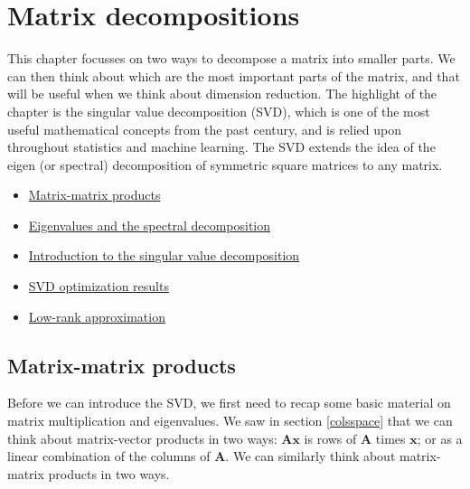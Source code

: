 \documentclass[]{book}
\providecommand{\tightlist}{%
  \setlength{\itemsep}{0pt}\setlength{\parskip}{0pt}}
\theoremstyle{definition}
\theoremstyle{definition}
\theoremstyle{definition}
\theoremstyle{remark}
\begin{document}
\hypertarget{linalg-decomp}{%
\chapter{Matrix decompositions}\label{linalg-decomp}}

This chapter focusses on two ways to decompose a matrix into smaller parts. We can then think about which are the most important parts of the matrix, and that will be useful when we think about dimension reduction. The highlight of the chapter is the singular value decomposition (SVD), which is one of the most useful mathematical concepts from the past century, and is relied upon throughout statistics and machine learning. The SVD extends the idea of the eigen (or spectral) decomposition of symmetric square matrices to any matrix.

\begin{itemize}
\tightlist
\item
  \href{https://mediaspace.nottingham.ac.uk/media/Matrix-matrix+products/1_kelw2beu}{Matrix-matrix products}
\item
  \href{https://mediaspace.nottingham.ac.uk/media/Eigenvalues+and+the+spectral+decomposition/1_drbz1eg8}{Eigenvalues and the spectral decomposition}
\item
  \href{https://mediaspace.nottingham.ac.uk/media/Singular+value+decompositionA+introduction/1_okyjnqic}{Introduction to the singular value decomposition}
\item
  \href{https://mediaspace.nottingham.ac.uk/media/Singular+value+decompositionA+optimization+results/1_9jv8zfw0}{SVD optimization results}
\item
  \href{https://mediaspace.nottingham.ac.uk/media/Singular+value+decompositionA+low+rank+approximation/1_vwbtjdzo}{Low-rank approximation}
\end{itemize}

\hypertarget{matrix-matrix}{%
\section{Matrix-matrix products}\label{matrix-matrix}}

Before we can introduce the SVD, we first need to recap some basic material on matrix multiplication and eigenvalues.
We saw in section \ref{colsspace} that we can think about matrix-vector products in two ways: \(\boldsymbol A\boldsymbol x\) is rows of \(\boldsymbol A\) times \(\boldsymbol x\); or as a linear combination of the columns of \(\boldsymbol A\). We can similarly think about matrix-matrix products in two ways.
\end{document}
